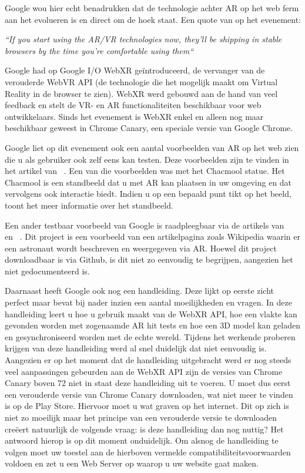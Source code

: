 Google wou hier echt benadrukken dat de technologie achter AR op het web ferm aan het evolueren is en direct om de hoek staat. Een quote van op het evenement:
 
\textit{``If you start using the AR/VR technologies now, they’ll be shipping in stable browsers by the time you’re comfortable using them``}

Google had op Google I/O WebXR geïntroduceerd, de vervanger van de verouderde WebVR API (de technologie die het mogelijk maakt om Virtual Reality in de browser te zien). WebXR werd gebouwd aan de hand van veel feedback en stelt de VR- en AR functionaliteiten beschikbaar voor web ontwikkelaars. Sinds het evenement is WebXR enkel en alleen nog maar beschikbaar geweest in Chrome Canary, een speciale versie van Google Chrome.
 
Google liet op dit evenement ook een aantal voorbeelden van AR op het web zien die u als gebruiker ook zelf eens kan testen. Deze voorbeelden zijn te vinden in het artikel van ~\textcite{Medley2018}. Een van die voorbeelden was met het Chacmool statue. Het Chacmool is een standbeeld dat u met AR kan plaatsen in uw omgeving en dat vervolgens ook interactie biedt. Indien u op een bepaald punt tikt op het beeld, toont het meer informatie over het standbeeld. 

Een ander testbaar voorbeeld van Google is raadpleegbaar via de artikels van ~\textcite{Stanush2018} en ~\textcite{Ali2018}. 
Dit project is een voorbeeld van een artikelpagina zoals Wikipedia waarin er een astronaut wordt beschreven en weergegeven via AR. Hoewel dit project downloadbaar is via Github, is dit niet zo eenvoudig te begrijpen, aangezien het niet gedocumenteerd is. 
 
 Daarnaast heeft Google ook nog een handleiding. Deze lijkt op eerste zicht perfect maar bevat bij nader inzien een aantal moeilijkheden en vragen. 
 In deze handleiding leert u hoe u gebruik maakt van de WebXR API, hoe een vlakte kan gevonden worden met zogenaamde AR hit tests en hoe een 3D model kan geladen en gesynchroniseerd worden met de echte wereld. Tijdens het werkende proberen krijgen van deze handleiding werd al snel duidelijk dat niet eenvoudig is. Aangezien er op het moment dat de handleiding uitgebracht werd er nog steeds veel aanpassingen gebeurden aan de WebXR API zijn de versies van Chrome Canary boven 72 niet in staat deze handleiding uit te voeren. U moet dus eerst een verouderde versie van Chrome Canary downloaden, wat niet meer te vinden is op de Play Store. Hiervoor moet u wat graven op het internet. Dit op zich is niet zo moeilijk maar het principe van een verouderde versie te downloaden creëert natuurlijk de volgende vraag: is deze handleiding dan nog nuttig? Het antwoord hierop is op dit moment onduidelijk. Om alsnog de handleiding te volgen moet uw toestel aan de hierboven vermelde compatibiliteitsvoorwaarden voldoen en zet u een Web Server op waarop u uw website gaat maken. 


